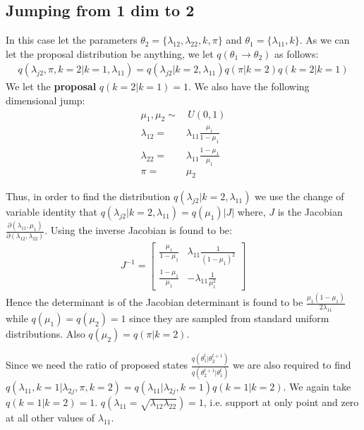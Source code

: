 \documentclass{article}
\begin{document}
\subsection{Jumping from 1 dim to 2}
In this case let the parameters $\theta_2=\{\lambda_{12},\lambda_{22},k,\pi\}$ and $\theta_1=\{\lambda_{11},k\}$. As we can let the proposal distribution be anything, we let $q(\theta_1\to\theta_2)$ as follows:
\begin{align}
q(\lambda_{j2},\pi,k=2|k=1,\lambda_{11})=q(\lambda_{j2}|k=2,\lambda_{11})q(\pi|k=2)q(k=2|k=1)
\end{align}
We let the \textbf{proposal} $q(k=2\vert k=1)=1$. We also have the following dimensional jump:
\begin{align}
\mu_1,\mu_2\sim & \,U(0,1)\\
\lambda_{12}=&\lambda_{11}\frac{\mu_1}{1-\mu_1}
\label{eq:lambda_12}\\
\lambda_{22}=&\lambda_{11}\frac{1-\mu_1}{\mu_1}
\label{eq:lambda_22}\\
\pi=&\mu_2
\end{align} 

Thus, in order to find the distribution $q(\lambda_{j2}\vert k=2,\lambda_{11})$ we use the change of variable identity that $q(\lambda_{j2}\vert k=2,\lambda_{11})=q(\mu_1)\vert J\vert$ where, $J$ is the Jacobian $\frac{\partial(\lambda_{11},\mu_1)}{\partial(\lambda_{12},\lambda_{22})}$. Using  the inverse Jacobian is found to be:
\begin{align}
J^{-1}=\begin{bmatrix}
\frac{\mu_1}{1-\mu_1} & \lambda_{11}\frac{1}{(1-\mu_1)^2}\\
\frac{1-\mu_1}{\mu_1} & -\lambda_{11}\frac{1}{\mu_1^2}
\end{bmatrix}
\end{align}
Hence the determinant is of the Jacobian determinant is found to be $\frac{\mu_1(1-\mu_1)}{2\lambda_{11}}$ while $q(\mu_1)=q(\mu_2)=1$ since they are sampled from standard uniform distributions. Also $q(\mu_2)=q(\pi\vert k=2)$.

Since we need the ratio of proposed states $ \frac{q(\theta_1^t|\theta_2^{t+1})}{q(\theta_2^{t+1}|\theta_1^{t})} $ we are also required to find $ q(\lambda_{11},k=1\vert\lambda_{2j},\pi,k=2) = q(\lambda_{11}\vert\lambda_{2j},k=1) q(k=1 \vert k=2) $. We again take $ q(k=1\vert k=2)=1 $. $q(\lambda_{11}=\sqrt{\lambda_{12}\lambda_{22}})=1$, i.e. support at only point and zero at all other values of $\lambda_{11}$.
 
\end{document}
